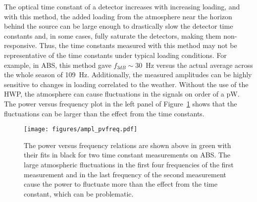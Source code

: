 The optical time constant of a detector increases with increasing loading, and with this method, the added loading from the atmosphere near the horizon behind the source can be large enough to drastically slow the detector time constants and, in some cases, fully saturate the detectors, making them non-responsive. Thus, the time constants measured with this method may not be representative of the time constants under typical loading conditions. For example, in ABS, this method gave $f_{3dB} \sim 30$~Hz versus the actual average across the whole season of 109~Hz. Additionally, the measured amplitudes can be highly sensitive to changes in loading correlated to the weather. Without the use of the HWP, the atmosphere can cause fluctuations in the signals on order of a pW. The power versus frequency plot in the left panel of Figure~\ref{fig:tc_chopper} shows that the fluctuations can be larger than the effect from the time constants.

\begin{figure}[h!]
\centering
\texttt{[image: figures/ampl\_pvfreq.pdf]}
\caption{The power versus frequency relations are shown above in green with their fits in black for two time constant measurements on ABS. The large atmospheric fluctuations in the first four frequencies of the first measurement and in the last frequency of the second measurement cause the power to fluctuate more than the effect from the time constant, which can be problematic.}
\label{fig:tc_chopper}
\end{figure}

